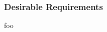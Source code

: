 
\subsubsection{Desirable Requirements}
\label{sec:eval_llvm_ir_library_desirable_requirements}

foo
